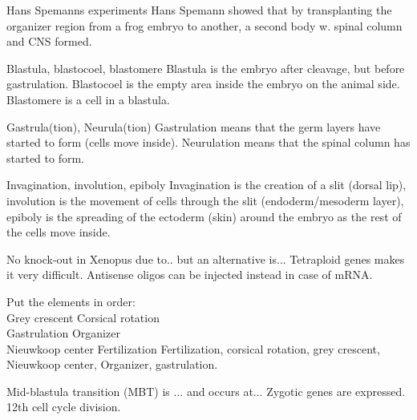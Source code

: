 
\begin{flashcard}[Experiment]{Hans Spemanns experiments}
    Hans Spemann showed that by transplanting the organizer region from a frog embryo to another, a second body w. spinal column and CNS formed. 
\end{flashcard}


\begin{flashcard}{Blastula, blastocoel, blastomere}
    Blastula is the embryo after cleavage, but before gastrulation. Blastocoel is the empty area inside the embryo on the animal side. Blastomere is a cell in a blastula.
\end{flashcard}

\begin{flashcard}{Gastrula(tion), Neurula(tion)}
    Gastrulation means that the germ layers have started to form (cells move inside). Neurulation means that the spinal column has started to form.
\end{flashcard}

\begin{flashcard}{Invagination, involution, epiboly}
    Invagination is the creation of a slit (dorsal lip), involution is the movement of cells through the slit (endoderm/mesoderm layer), epiboly is the spreading of the ectoderm (skin) around the embryo as the rest of the cells move inside.
\end{flashcard}

\begin{flashcard}{No knock-out in Xenopus due to.. but an alternative is...}
    Tetraploid genes makes it very difficult. Antisense oligos can be injected instead in case of mRNA.
\end{flashcard}

\begin{flashcard}{Put the elements in order: \\
Grey crescent \qquad Corsical rotation \\
Gastrulation \qquad Organizer  \\
Nieuwkoop center \qquad Fertilization}
    Fertilization, corsical rotation, grey crescent, Nieuwkoop center, Organizer, gastrulation.
\end{flashcard}

\begin{flashcard}{Mid-blastula transition (MBT) is ... and occurs at...}
    Zygotic genes are expressed. 12th cell cycle division. 
\end{flashcard}

